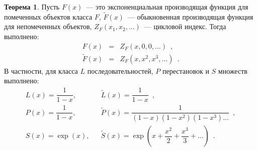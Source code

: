 \documentclass{article}
\theoremstyle{definition}
\newtheorem*{theorem}{Теорема}
\begin{document}
\begin{theorem}
Пусть \( F(x) \)~--- это экспоненциальная производящая функция для помеченных
объектов класса \( F \), \( \widetilde F(x) \)~--- обыкновенная производящая
функция для непомеченных объектов, \( Z_F(x_1, x_2, \ldots) \)~--- цикловой
индекс. Тогда выполнено:
\begin{eqnarray*}
    F(x) &=&  Z_F(x, 0, 0, \ldots) \enspace , \\ 
    \widetilde F(x) &=& Z_F(x, x^2, x^3, \ldots) \enspace . 
\end{eqnarray*}
В частности, для класса \( L \) последовательностей, \( P \) перестановок и \( S
\) множеств выполнено:
\begin{eqnarray*}
    L(x) = \dfrac{1}{1 - x}, && \widetilde L(x) = \dfrac{1}{1-x}\enspace  , \\
    P(x) = \dfrac{1}{1 - x}, && \widetilde P(x) = \dfrac{1}{(1-x)(1 - x^2)(1 -
x^3) \ldots} \enspace , \\
    S(x) = \exp(x), &  &
\widetilde S(x) = \exp\left( x + \dfrac{x^2}{2} + \dfrac{x^3}{3} + \ldots
\right) \enspace .
\end{eqnarray*}
\end{theorem}
\end{document}

